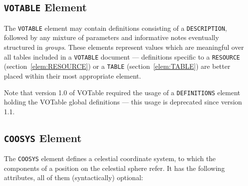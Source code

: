 \documentclass[11pt,a4paper]{ivoa}
\def\Aref#1{section~\ref{#1}}
\let\fg=\color
\def\elem#1{{\tt{\fg{DarkRed}#1}}}
\begin{document}
\subsection{\elem{VOTABLE} Element}
\label{sec:definitions}

The \elem{VOTABLE} element may contain definitions consisting of
a \elem{DESCRIPTION}, followed by any mixture of parameters and
informative notes eventually structured in {\em groups}.
These elements represent values which are meaningful over all tables
included in a \elem{VOTABLE} document --- definitions specific to
a \elem{RESOURCE} (\Aref{elem:RESOURCE})
or a \elem{TABLE} (\Aref{elem:TABLE}) are better placed
within their most appropriate element.

Note that version 1.0 of VOTable required the usage of a \elem{DEFINITIONS}
element holding the VOTable global definitions --- this
usage is deprecated since version 1.1.

\subsection{\elem{COOSYS} Element}
\label{elem:COOSYS}

The \elem{COOSYS} element defines a celestial coordinate system, to
which the components of a position on the celestial sphere refer.  It
has the following attributes, all of them (syntactically) optional:
\end{document}
